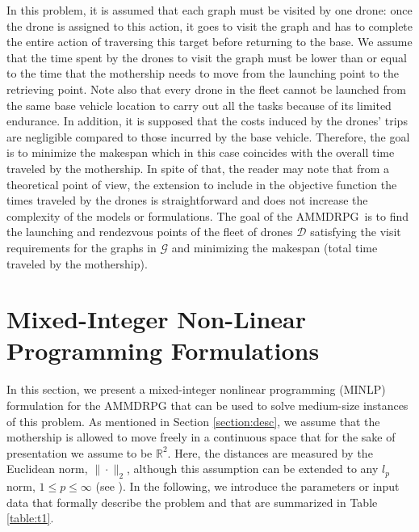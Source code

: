 \documentclass[10pt,a4paper]{elsarticle}
\def\AMD{{\sf AMMDRPG\xspace}}
\newcommand{\EN}[1]{{\color{black}#1}}
\begin{document}
\noindent
In this problem, it is assumed that each graph must be visited by one drone: once the drone is assigned to this action, it goes to visit the graph and has to complete the entire action of traversing this target before \EN{returning} to the base. 
We assume that the time spent by the drones to visit the graph must be lower than or equal to the time that the mothership needs to move from the launching point to the retrieving point. Note also that every drone \EN{in} the fleet cannot be launched from the same base vehicle location to \EN{carry out} all the tasks because of its limited endurance. In addition, it is supposed that the costs induced by the drones' trips are negligible compared to those incurred by the base vehicle. Therefore, the goal is to minimize the makespan which in this case coincides with the overall time traveled by the mothership. In spite of that, the reader may note that from a theoretical point of view, the extension to include in the objective function the times traveled by the drones is straightforward and does not increase the complexity of the models \EN{or} formulations.
\noindent
The goal of the \AMD \ is to find the launching and rendezvous points of the fleet of drones $\mathcal D$ satisfying the visit requirements for the graphs in $\mathcal G$ and minimizing the makespan (total time traveled by the mothership).\\

\noindent

\section{Mixed\EN{-}Integer Non\EN{-}Linear Programming Formulations}\label{Form}
\noindent
In this section, we present a mixed-integer nonlinear programming (MINLP) formulation for the \AMD \;\hspace{-2pt}  that can be used to solve medium\EN{-}size instances of this problem.
\noindent
As mentioned in Section \ref{section:desc}, we assume that the mothership is allowed to move freely in a continuous space that for the sake of presentation we  assume to be $\mathbb R^2$. Here, the distances are measured by the Euclidean norm, $\|\cdot\|_2$, although this assumption can be extended to any $l_p$ norm, $1\leq p\leq \infty$ (see \cite{Blanco2017}).
\noindent
In the following, we introduce the parameters or input data that formally describe the problem and that are summarized in Table \ref{table:t1}.
\end{document}

